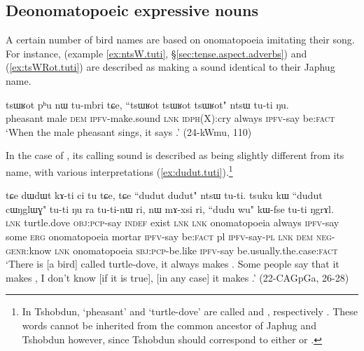 \subsection{Deonomatopoeic expressive nouns} \label{sec:underived.expressive.nouns}
A certain number of bird names are based on onomatopoeia imitating their song. For instance,   (example \ref{ex:ntsW.tuti}, §\ref{sec:tense.aspect.adverbs})  and  (\ref{ex:tsWRot.tuti}) are described as making a sound identical to their Japhug name.

\begin{exe}
\ex \label{ex:tsWRot.tuti}
\gll  tsɯʁot pʰu nɯ tu-mbri tɕe, {``tsɯʁot tsɯʁot tsɯʁot"} ntsɯ tu-ti ŋu. \\
pheasant male \textsc{dem} \textsc{ipfv}-make.sound \textsc{lnk} \textsc{idph}(X):cry always \textsc{ipfv}-say  be:\textsc{fact} \\
\glt `When the male pheasant sings, it says .' (24-kWmu, 110)
\end{exe}

In the case of  , its calling sound is described as being slightly different from its name, with various interpretations (\ref{ex:dudut.tuti}).\footnote{In Tshobdun, `pheasant' and `turtle-dove' are called  and , respectively \citep[137]{jackson19tshobdun}. These words cannot be inherited from the common ancestor of Japhug and Tshobdun however, since Tshobdun  should correspond to either  or . }

\begin{exe}
\ex \label{ex:dudut.tuti}
\gll tɕe dɯdɯt kɤ-ti ci tu tɕe, tɕe {``dudut dudut"}  ntsɯ tu-ti. tsuku kɯ ``dudut cɯŋglɯɣ" tu-ti ŋu ra tu-ti-nɯ ri, nɯ mɤ-xsi ri, {``dudu wu"} kɯ-fse tu-ti ŋgrɤl. \\
\textsc{lnk} turtle.dove \textsc{obj}:\textsc{pcp}-say \textsc{indef} exist \textsc{lnk} \textsc{lnk} onomatopoeia always \textsc{ipfv}-say some \textsc{erg} onomatopoeia mortar \textsc{ipfv}-say  be:\textsc{fact} pl \textsc{ipfv}-say-\textsc{pl} \textsc{lnk} \textsc{dem} \textsc{neg}-\textsc{genr}:know \textsc{lnk} onomatopoeia \textsc{sbj}:\textsc{pcp}-be.like \textsc{ipfv}-say be.usually.the.case:\textsc{fact} \\
\glt `There is [a bird] called turtle-dove, it always makes . Some people say that it makes , I don't know [if it is true], [in any case] it makes .' (22-CAGpGa, 26-28)
\end{exe}

